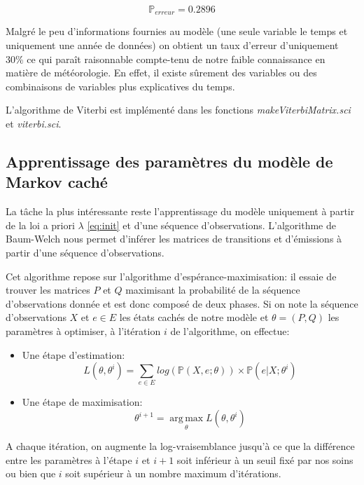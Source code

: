\documentclass{article}
\begin{document}
\begin{multicols}{2}
\begin{equation}\label{perreur}
    \mathbb{P}_{erreur} = 0.2896
\end{equation}

Malgré le peu d'informations fournies au modèle (une seule variable le
temps et uniquement une année de données) on obtient un taux d'erreur
d'uniquement 30\% ce qui paraît raisonnable compte-tenu de notre faible
connaissance en matière de météorologie. En effet, il existe sûrement des
variables ou des combinaisons de variables plus explicatives du temps.

L'algorithme de Viterbi est implémenté dans les fonctions
\emph{makeViterbiMatrix.sci} et \emph{viterbi.sci}.

\subsection{Apprentissage des paramètres du modèle de Markov caché}

La tâche la plus intéressante reste l'apprentissage du modèle uniquement à
partir de la loi a priori $\lambda$ \ref{eq:init} et d'une séquence
d'observations. L'algorithme de Baum-Welch nous permet d'inférer les matrices
de transitions et d'émissions à partir d'une séquence d'observations.

Cet algorithme repose sur l'algorithme d'espérance-maximisation: il essaie de
trouver les matrices $P$ et $Q$ maximisant la probabilité de la séquence
d'observations donnée et est donc composé de deux phases. Si on note la séquence
d'observations $X$ et $e \in E$ les états cachés de notre modèle et
$\theta = (P, Q)$ les paramètres à optimiser, à l'itération $i$ de
l'algorithme, on effectue:

\begin{itemize}
    \item Une étape d'estimation:
        \begin{equation}
            L(\theta, \theta^i) = \sum_{e \in E} log(\mathbb{P}(X, e; \theta))
            \times \mathbb{P}(e | X; \theta^i)
        \end{equation}
    \item Une étape de maximisation:
        \begin{equation}
            \theta^{i + 1} = \operatorname*{arg \, max}_{\theta} L(\theta, \theta^{i})
        \end{equation}
\end{itemize}

A chaque itération, on augmente la log-vraisemblance jusqu'à ce que la
différence entre les paramètres à l'étape $i$ et $i + 1$ soit inférieur à un
seuil fixé par nos soins ou bien que $i$ soit supérieur à un nombre maximum
d'itérations.


\end{multicols}
\end{document}
